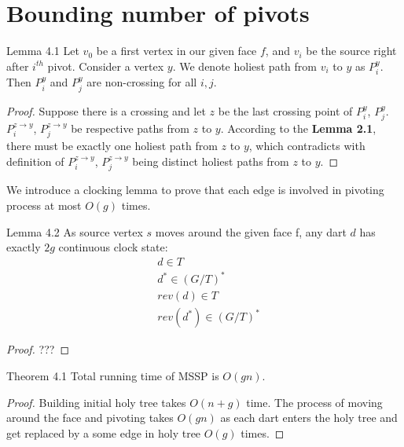 \documentclass{article}
\begin{document}
\begin{figure}
\begin{subfigure}{.5\textwidth}
\end{subfigure}
\end{figure}

\newpage
\section{Bounding number of pivots}

\begin{oneshot}{Lemma 4.1}
Let $v_0$ be a first vertex in our given face $f$, and $v_i$ be the source right
after $i^{th}$ pivot. Consider a vertex $y$. We denote holiest path from 
$v_i$ to $y$ as $P_i^{y}$. Then $P_i^{y}$ and $P_j^{y}$ are non-crossing for 
all $i, j$.
\end{oneshot}
\begin{proof}
Suppose there is a crossing and let $z$ be the last crossing point of $P_i^{y}$, $P_j^{y}$. $P_i^{z \rightarrow y}$, $P_j^{z \rightarrow y}$ be respective paths from $z$ to $y$. According to the \textbf{Lemma 2.1}, there must be exactly one holiest path from $z$ to $y$, which contradicts with definition of $P_i^{z \rightarrow y}$, $P_j^{z \rightarrow y}$ being distinct holiest paths from $z$ to $y$.
\end{proof}

We introduce a clocking lemma to prove that each edge is involved in pivoting 
process at most $O(g)$ times.

\begin{oneshot}{Lemma 4.2}
As source vertex $s$ moves around the given face f, any dart $d$ has exactly
$2g$ continuous clock state: 
\begin{align*}
& d \in T \\
& d^{*} \in (G/T)^{*} \\
& rev(d) \in T \\
& rev(d^{*}) \in (G/T)^{*}
\end{align*}
\end{oneshot}
\begin{proof}
{\color{red}???}
\end{proof}


\begin{oneshot}{Theorem 4.1}
Total running time of MSSP is $O(gn)$.
\end{oneshot}
\begin{proof}
Building initial holy tree takes $O(n + g)$ time. The process of moving around the
face and pivoting takes $O(gn)$ as each dart enters the holy tree and get replaced by a some edge in holy tree $O(g)$ times.
\end{proof}
\end{document}
